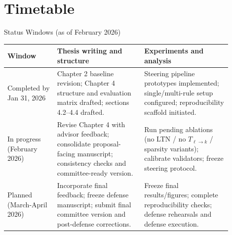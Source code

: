 \section{Timetable}

\begin{frame}{Status Windows (as of February 2026)}
    \scriptsize
    \begin{table}
        \centering
        \begin{tabular}{p{0.2\linewidth}p{0.35\linewidth}p{0.35\linewidth}}
            \toprule
            \textbf{Window} & \textbf{Thesis writing and structure} & \textbf{Experiments and analysis} \\
            \midrule
            Completed by Jan 31, 2026 &
            Chapter 2 baseline revision; Chapter 4 structure and evaluation matrix drafted; sections 4.2--4.4 drafted. &
            Steering pipeline prototypes implemented; single/multi-rule setup configured; reproducibility scaffold initiated. \\
            \addlinespace[0.25em]
            In progress (February 2026) &
            Revise Chapter 4 with advisor feedback; consolidate proposal-facing manuscript; consistency checks and committee-ready version. &
            Run pending ablations (no LTN / no $T_{\ell\to k}$ / sparsity variants); calibrate validators; freeze steering protocol. \\
            \addlinespace[0.25em]
            Planned (March-April 2026) &
            Incorporate final feedback; freeze defense manuscript; submit final committee version and post-defense corrections. &
            Freeze final results/figures; complete reproducibility checks; defense rehearsals and defense execution. \\
            \bottomrule
        \end{tabular}
    \end{table}
\end{frame}

